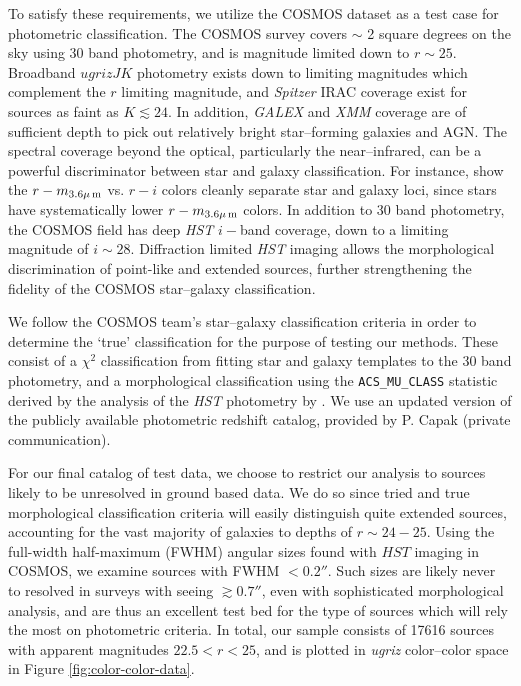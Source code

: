 \documentclass[12pt,preprint]{aastex}
\begin{document}
To satisfy these requirements, we utilize the COSMOS dataset as a 
test case for photometric classification.  The COSMOS survey 
\citep{scoville07} covers $\sim$ 2 square degrees on the sky using 30 band 
photometry, and is magnitude limited down to $r \sim 25$.  Broadband $ugrizJK$ 
photometry exists down to limiting magnitudes which complement the $r$ 
limiting magnitude, and {\it Spitzer} IRAC coverage exist for sources 
as faint as $K\lesssim24$.  In addition, {\it GALEX} and {\it XMM} coverage 
are of sufficient depth to pick out relatively bright star--forming 
galaxies and AGN.  The spectral coverage beyond the optical, 
particularly the near--infrared, can be a powerful discriminator 
between star and galaxy classification.  For instance, \citet{ilbert09}
show the $r-m_{\rm 3.6\mu\,m}$ vs. $r-i$ colors cleanly separate 
star and galaxy loci, since stars have systematically lower 
$r-m_{\rm 3.6\mu\,m}$ colors.  In addition to 30 band photometry, 
the COSMOS field has deep \textit{HST} $i-$band coverage, down to 
a limiting magnitude of $i\sim28$.  Diffraction limited \textit{HST}  
imaging allows the morphological discrimination of point-like and 
extended sources, further strengthening the fidelity of the COSMOS 
star--galaxy classification.

We follow the COSMOS team's star--galaxy classification criteria 
in order to determine the `true' classification for the purpose of 
testing our methods.  These consist of a $\chi^2$ classification 
from fitting star and galaxy templates to the 30 band photometry, 
and a morphological classification using the 
{\tt ACS\_MU\_CLASS} statistic derived by the analysis of the 
\textit{HST} photometry by \citet{scarlata07}.  We use an updated 
version of the publicly available photometric redshift catalog, 
provided by P. Capak (private communication).  

For our final catalog of test data, we choose to restrict our analysis 
to sources likely to be unresolved in ground based data.  We do so 
since tried and true morphological classification criteria will easily 
distinguish quite extended sources, accounting for the vast majority 
of galaxies to depths of $r\sim24-25$.  Using the full-width half-maximum 
(FWHM) angular sizes found with $HST$ 
imaging in COSMOS, we examine sources with FWHM $< 0.2''$.  Such 
sizes are likely never to resolved in surveys with seeing $\gtrsim0.7''$, even 
with sophisticated morphological analysis, and are thus an excellent test 
bed for the type of sources which will rely the most on photometric 
criteria.  In total, our sample consists of 17616 sources with apparent 
magnitudes $22.5<r<25$, and is plotted in {\it ugriz} color--color space 
in Figure \ref{fig:color-color-data}.
\end{document}
